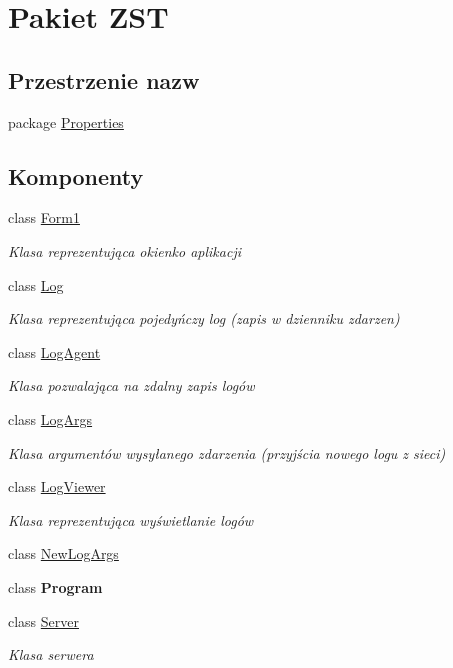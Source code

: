 \hypertarget{namespace_z_s_t}{}\section{Pakiet Z\+S\+T}
\label{namespace_z_s_t}
\subsection*{Przestrzenie nazw}
\begin{DoxyCompactItemize}
\item 
package \hyperlink{namespace_z_s_t_1_1_properties}{Properties}
\end{DoxyCompactItemize}
\subsection*{Komponenty}
\begin{DoxyCompactItemize}
\item 
class \hyperlink{class_z_s_t_1_1_form1}{Form1}
\begin{DoxyCompactList}\small\item\em Klasa reprezentująca okienko aplikacji \end{DoxyCompactList}\item 
class \hyperlink{class_z_s_t_1_1_log}{Log}
\begin{DoxyCompactList}\small\item\em Klasa reprezentująca pojedyńczy log (zapis w dzienniku zdarzen) \end{DoxyCompactList}\item 
class \hyperlink{class_z_s_t_1_1_log_agent}{Log\+Agent}
\begin{DoxyCompactList}\small\item\em Klasa pozwalająca na zdalny zapis logów \end{DoxyCompactList}\item 
class \hyperlink{class_z_s_t_1_1_log_args}{Log\+Args}
\begin{DoxyCompactList}\small\item\em Klasa argumentów wysyłanego zdarzenia (przyjścia nowego logu z sieci) \end{DoxyCompactList}\item 
class \hyperlink{class_z_s_t_1_1_log_viewer}{Log\+Viewer}
\begin{DoxyCompactList}\small\item\em Klasa reprezentująca wyświetlanie logów \end{DoxyCompactList}\item 
class \hyperlink{class_z_s_t_1_1_new_log_args}{New\+Log\+Args}
\item 
class {\bfseries Program}
\item 
class \hyperlink{class_z_s_t_1_1_server}{Server}
\begin{DoxyCompactList}\small\item\em Klasa serwera \end{DoxyCompactList}\end{DoxyCompactItemize}
